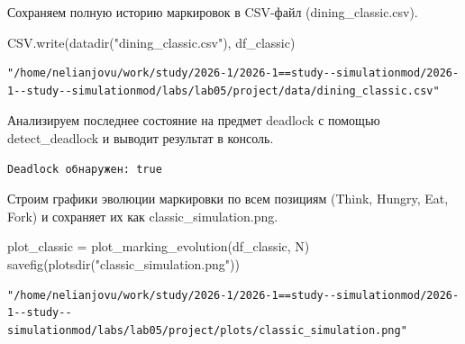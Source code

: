 \documentclass[
  12pt,
  a4paper,
  DIV=11,
  numbers=noendperiod]{scrreprt}
\newenvironment{Shaded}{\begin{snugshade}}{\end{snugshade}}
\newcommand{\FunctionTok}[1]{\textcolor[rgb]{0.28,0.35,0.67}{#1}}
\newcommand{\NormalTok}[1]{\textcolor[rgb]{0.00,0.23,0.31}{#1}}
\newcommand{\OperatorTok}[1]{\textcolor[rgb]{0.37,0.37,0.37}{#1}}
\newcommand{\SpecialCharTok}[1]{\textcolor[rgb]{0.37,0.37,0.37}{#1}}
\newcommand{\StringTok}[1]{\textcolor[rgb]{0.13,0.47,0.30}{#1}}
\begin{document}
Сохраняем полную историю маркировок в CSV-файл (dining\_classic.csv).

\begin{Shaded}
\begin{Highlighting}[]
\NormalTok{CSV.}\FunctionTok{write}\NormalTok{(}\FunctionTok{datadir}\NormalTok{(}\StringTok{"dining\_classic.csv"}\NormalTok{), df\_classic)}
\end{Highlighting}
\end{Shaded}

\begin{verbatim}
"/home/nelianjovu/work/study/2026-1/2026-1==study--simulationmod/2026-1--study--simulationmod/labs/lab05/project/data/dining_classic.csv"
\end{verbatim}

Анализируем последнее состояние на предмет deadlock с помощью
detect\_deadlock и выводит результат в консоль.

\begin{Shaded}
\end{Shaded}

\begin{verbatim}
Deadlock обнаружен: true
\end{verbatim}

Строим графики эволюции маркировки по всем позициям (Think, Hungry, Eat,
Fork) и сохраняет их как classic\_simulation.png.

\begin{Shaded}
\begin{Highlighting}[]
\NormalTok{plot\_classic }\OperatorTok{=} \FunctionTok{plot\_marking\_evolution}\NormalTok{(df\_classic, N)}
\FunctionTok{savefig}\NormalTok{(}\FunctionTok{plotsdir}\NormalTok{(}\StringTok{"classic\_simulation.png"}\NormalTok{))}
\end{Highlighting}
\end{Shaded}

\begin{verbatim}
"/home/nelianjovu/work/study/2026-1/2026-1==study--simulationmod/2026-1--study--simulationmod/labs/lab05/project/plots/classic_simulation.png"
\end{verbatim}
\end{document}
